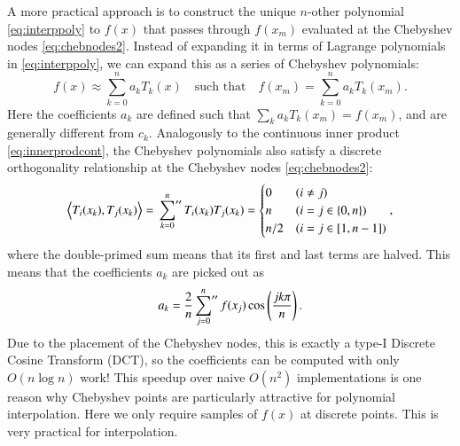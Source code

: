 \documentclass{aa}
\newcommand\innerproduct[2]{\left\langle #1, #2 \right\rangle}
\begin{document}
A more practical approach is to construct the unique $n$-other polynomial \eqref{eq:interppoly} to $f(x)$ that passes through $f(x_m)$ evaluated at the Chebyshev nodes \eqref{eq:chebnodes2}.
Instead of expanding it in terms of Lagrange polynomials in \eqref{eq:interppoly}, we can expand this as a series of Chebyshev polynomials:
\begin{equation}
	f(x) \approx \sum_{k=0}^n a_k T_k(x)
	\quad \text{such that} \quad
	f(x_m) = \sum_{k=0}^n a_k T_k(x_m) .
\label{eq:interpolation}
\end{equation}
Here the coefficients $a_k$ are defined such that $\sum_k a_k T_k(x_m) = f(x_m)$, and are generally different from $c_k$.
Analogously to the continuous inner product \eqref{eq:innerprodcont}, the Chebyshev polynomials also satisfy a discrete orthogonality relationship at the Chebyshev nodes \eqref{eq:chebnodes2}:
\begin{equation}
	\innerproduct{T_i(x_k)}{T_j(x_k)} = \sideset{}{''}\sum_{k=0}^n T_i(x_k) T_j(x_k) = \begin{cases} 0 & (i \neq j) \\ n & (i = j \in \{0, n\}) \\ n/2 & (i = j \in [1,n-1]) \end{cases},
\label{eq:innerproddiscrete}
\end{equation}
where the double-primed sum means that its first and last terms are halved.
This means that the coefficients $a_k$ are picked out as
\begin{equation}
	a_k = \frac{2}{n} \sideset{}{''}\sum_{j=0}^n f(x_j) \cos \left( \frac{jk\pi}{n} \right) .
\end{equation}
Due to the placement of the Chebyshev nodes, this is exactly a type-I Discrete Cosine Transform (DCT), so the coefficients can be computed with only $O(n \log n)$ work!
This speedup over naive $O(n^2)$ implementations is one reason why Chebyshev points are particularly attractive for polynomial interpolation.
Here we only require samples of $f(x)$ at discrete points.
This is very practical for interpolation.
\end{document}
